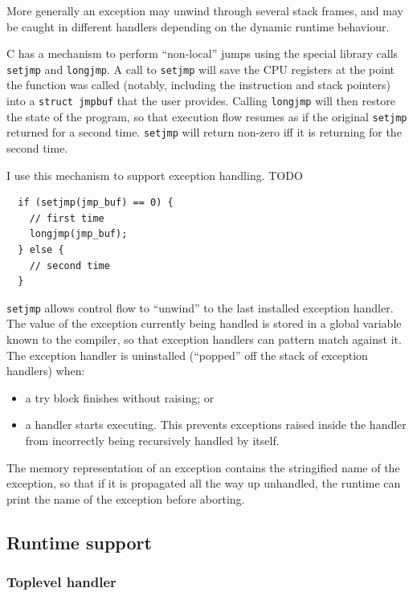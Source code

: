\documentclass[12pt,a4paper,twoside,openright]{report}
\begin{document}
More generally an exception may unwind through several stack frames, and may be
caught in different handlers depending on the dynamic runtime behaviour.

C has a mechanism to perform ``non-local'' jumps using the special library
calls \lstinline!setjmp! and \lstinline!longjmp!. A call to \lstinline!setjmp!
will save the CPU registers at the point the function was called (notably,
including the instruction and stack pointers) into a \lstinline!struct jmpbuf!
that the user provides. Calling \lstinline!longjmp! will then restore the state
of the program, so that execution flow resumes as if the original
\lstinline!setjmp! returned for a second time. \lstinline!setjmp! will return
non-zero iff it is returning for the second time.

I use this mechanism to support exception handling. TODO

\begin{lstlisting}
  if (setjmp(jmp_buf) == 0) {
    // first time
    longjmp(jmp_buf);
  } else {
    // second time
  }
\end{lstlisting}

\lstinline!setjmp! allows control flow to ``unwind'' to the last installed
exception handler. The value of the exception currently being handled is stored
in a global variable known to the compiler, so that exception handlers can
pattern match against it. The exception handler is uninstalled (``popped'' off
the stack of exception handlers) when:
\begin{itemize}
  \item a try block finishes without raising; or
  \item a handler starts executing. This prevents exceptions raised inside the
      handler from incorrectly being recursively handled by itself.
\end{itemize}

The memory representation of an exception contains the stringified name of the
exception, so that if it is propagated all the way up unhandled, the runtime
can print the name of the exception before aborting.

\subsection{Runtime support}\label{exceptions-runtime-support}

\subsubsection{Toplevel handler}
\end{document}
